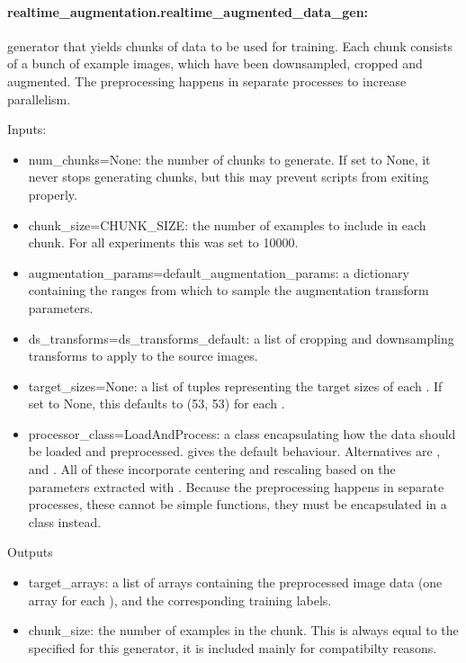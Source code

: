 \documentclass[a4paper,10pt]{article}
\begin{document}
\paragraph{realtime\_augmentation.realtime\_augmented\_data\_gen:} generator that yields chunks of data to be used for training. Each chunk consists of a bunch of example images, which have been downsampled, cropped and augmented. The preprocessing happens in separate processes to increase parallelism.

Inputs:
 \begin{itemize}
  \item{num\_chunks=None:} the number of chunks to generate. If set to None, it never stops generating chunks, but this may prevent scripts from exiting properly.
  \item{chunk\_size=CHUNK\_SIZE:} the number of examples to include in each chunk. For all experiments this was set to 10000.
  \item{augmentation\_params=default\_augmentation\_params:} a dictionary containing the ranges from which to sample the augmentation transform parameters.
  \item{ds\_transforms=ds\_transforms\_default:} a list of cropping and downsampling transforms to apply to the source images.
  \item{target\_sizes=None:} a list of tuples representing the target sizes of each . If set to None, this defaults to (53, 53) for each .
  \item{processor\_class=LoadAndProcess:} a class encapsulating how the data should be loaded and preprocessed.  gives the default behaviour. Alternatives are ,  and . All of these incorporate centering and rescaling based on the parameters extracted with . Because the preprocessing happens in separate processes, these cannot be simple functions, they must be encapsulated in a class instead.
 \end{itemize}
 
Outputs
 \begin{itemize}
  \item{target\_arrays:} a list of arrays containing the preprocessed image data (one array for each ), and the corresponding training labels.
  \item{chunk\_size:} the number of examples in the chunk. This is always equal to the specified  for this generator, it is included mainly for compatibilty reasons.
 \end{itemize}
 
\end{document}
